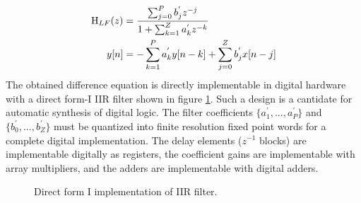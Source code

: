 			\begin{align}
				\textnormal{H}_{LF}(z) &= \frac{\sum_{j=0}^P b_j^{'}z^{-j}}{1+\sum_{k=1}^Z a_k^{'}z^{-k}}\label{eq:canonical_z_tf} \\
				y[n]&= -\sum_{k=1}^P a_k^{'}y[n-k] + \sum_{j=0}^Z b_j^{'}x[n-j] \label{eq:cananical_diff_eq}
			\end{align}
			The obtained difference equation is directly implementable in digital hardware with a direct form-I IIR filter \cite{proakis_1993} shown in figure \ref{fig:filt_implementation}. Such a design is a cantidate for automatic synthesis of digital logic. The filter coefficients $\{a_1^{'}, ..., a_P^{'}\}$ and $\{b_0^{'}, ..., b_Z^{'}\}$ must be quantized into finite resolution fixed point words for a complete digital implementation. The delay elements ($z^{-1}$ blocks) are implementable digitally as registers, the coefficient gains are implementable with array multipliers, and the adders are implementable with digital adders.
			\begin{figure}[htb!]
				\center
				\caption{Direct form I implementation of IIR filter.}
				\label{fig:filt_implementation}
			\end{figure}


			
